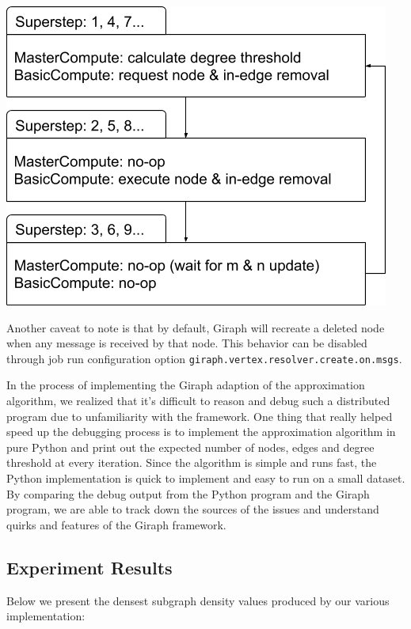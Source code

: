 \documentclass{article}
\begin{document}
\includegraphics[width=0.8\columnwidth]{giraph_job.png}

Another caveat to note is that by default, Giraph will recreate a deleted node when any message is received by that node. This behavior can be disabled through job run configuration option \texttt{giraph.vertex.resolver.create.on.msgs}.

In the process of implementing the Giraph adaption of the approximation algorithm, we realized that it's difficult to reason and debug such a distributed program due to unfamiliarity with the framework. One thing that really helped speed up the debugging process is to implement the approximation algorithm in pure Python and print out the expected number of nodes, edges and degree threshold at every iteration. Since the algorithm is simple and runs fast, the Python implementation is quick to implement and easy to run on a small dataset. By comparing the debug output from the Python program and the Giraph program, we are able to track down the sources of the issues and understand quirks and features of the Giraph framework.

\subsection{Experiment Results}
Below we present the densest subgraph density values produced by our various implementation:
\end{document}
